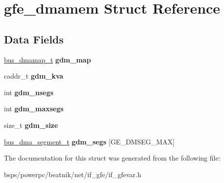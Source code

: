 \hypertarget{structgfe__dmamem}{}\section{gfe\+\_\+dmamem Struct Reference}
\label{structgfe__dmamem}
\subsection*{Data Fields}
\begin{DoxyCompactItemize}
\item 
\mbox{\label{structgfe__dmamem_ae00a7b3c4d6e1eea54da0d1d2ff9cba0}} 
\mbox{\hyperlink{structgfe__dmamem}{bus\+\_\+dmamap\+\_\+t}} {\bfseries gdm\+\_\+map}
\item 
\mbox{\label{structgfe__dmamem_a22128266bb68791d9f6a4de7c16aa05d}} 
caddr\+\_\+t {\bfseries gdm\+\_\+kva}
\item 
\mbox{\label{structgfe__dmamem_acdbc746249659eb27e4b23923c6aa7f8}} 
int {\bfseries gdm\+\_\+nsegs}
\item 
\mbox{\label{structgfe__dmamem_aede21d7bdcf4eca42e7c9c0295ceffad}} 
int {\bfseries gdm\+\_\+maxsegs}
\item 
\mbox{\label{structgfe__dmamem_a275ea8bfaf4093ebd1f8b2e5c38ae1cc}} 
size\+\_\+t {\bfseries gdm\+\_\+size}
\item 
\mbox{\label{structgfe__dmamem_a0396c0092b25df7833af9710b0c9fdc4}} 
\mbox{\hyperlink{structbus__dma__segment__t}{bus\+\_\+dma\+\_\+segment\+\_\+t}} {\bfseries gdm\+\_\+segs} \mbox{[}G\+E\+\_\+\+D\+M\+S\+E\+G\+\_\+\+M\+AX\mbox{]}
\end{DoxyCompactItemize}


The documentation for this struct was generated from the following file\+:\begin{DoxyCompactItemize}
\item 
bsps/powerpc/beatnik/net/if\+\_\+gfe/if\+\_\+gfevar.\+h\end{DoxyCompactItemize}
